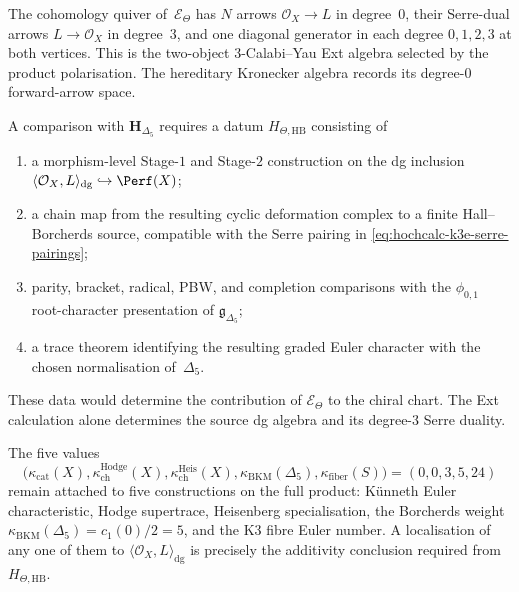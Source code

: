 \begin{remark}
\label{rem:hochcalc-kuznetsov-bkm-non-kronecker}
The cohomology quiver of~$\mathcal E_\Theta$ has $N$ arrows
$\mathcal O_X\to L$ in degree~$0$, their Serre-dual arrows
$L\to\mathcal O_X$ in degree~$3$, and one diagonal generator in each
degree $0,1,2,3$ at both vertices.  This is the two-object
$3$-Calabi--Yau Ext algebra selected by the product polarisation.  The
hereditary Kronecker algebra records its degree-$0$ forward-arrow
space.

A comparison with $\mathbf H_{\Delta_5}$ requires a datum
$H_{\Theta,\mathrm{HB}}$ consisting of
\begin{enumerate}[label=\textup{(\roman*)}]
\item a morphism-level Stage-$1$ and Stage-$2$ construction on the dg
inclusion
$\langle\mathcal O_X,L\rangle_{\mathrm{dg}}\hookrightarrow\Perf(X)$;
\item a chain map from the resulting cyclic deformation complex to a
finite Hall--Borcherds source, compatible with the Serre pairing in
\eqref{eq:hochcalc-k3e-serre-pairings};
\item parity, bracket, radical, PBW, and completion comparisons with
the $\phi_{0,1}$ root-character presentation of
$\mathfrak g_{\Delta_5}$;
\item a trace theorem identifying the resulting graded Euler
character with the chosen normalisation of~$\Delta_5$.
\end{enumerate}
These data would determine the contribution of
$\mathcal E_\Theta$ to the chiral chart.  The Ext calculation alone
determines the source dg algebra and its degree-$3$ Serre duality.

The five values
\[
 \bigl(\kappa_{\mathrm{cat}}(X),
 \kappa_{\mathrm{ch}}^{\mathrm{Hodge}}(X),
 \kappa_{\mathrm{ch}}^{\mathrm{Heis}}(X),
 \kappa_{\mathrm{BKM}}(\Delta_5),
 \kappa_{\mathrm{fiber}}(S)\bigr)
 =(0,0,3,5,24)
\]
remain attached to five constructions on the full product:
K\"unneth Euler characteristic, Hodge supertrace, Heisenberg
specialisation, the Borcherds weight
$\kappa_{\mathrm{BKM}}(\Delta_5)=c_1(0)/2=5$, and the K3 fibre Euler
number.  A localisation of any one of them to
$\langle\mathcal O_X,L\rangle_{\mathrm{dg}}$ is precisely the
additivity conclusion required from $H_{\Theta,\mathrm{HB}}$.
\end{remark}

